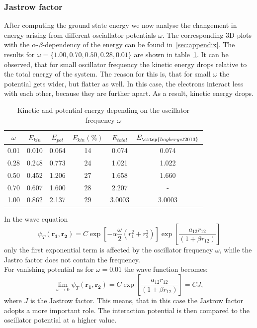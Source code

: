 \subsubsection{Jastrow factor}\label{sec:Jastro}
After computing the ground state energy we now analyse the changement in energy arising from different osciallator potentials $\omega$. The corresponding 3D-plots with the $\alpha$-$\beta$-dependency of the energy can be found in~\ref{sec:appendix}. The results for $\omega =\{1.00, 0.70, 0.50,0.28,0.01\}$ are shown in table~\ref{tab:omega}. It can be observed, that for small oscillator frequency the kinetic energy drops relative to the total energy of the system. The reason for this is, that for small $\omega$ the potential gets wider, but flatter as well. In this case, the electrons interact less with each other, because they are further apart. As a result, kinetic energy drops.\\
\begin{table}[H]
\centering
\caption{Kinetic and potential energy depending on the oscillator frequency $\omega$}
    \begin{tabular}{c|cc|c|c|c}
   \toprule
    $\omega$ & $E_{kin}$  & $E_{pot}$  & $E_{kin} (\%)$ & $E_{total}$ & $E_{\citep{hogberget2013}}$ \\ 
    \midrule
    0.01   & 0.010 & 0.064 & 14   & 0.074    & 0.074   \\
    0.28   & 0.248  & 0.773  & 24   & 1.021   & 1.022  \\
    0.50    & 0.452  & 1.206   & 27   & 1.658  & 1.660    \\
    0.70    & 0.607  & 1.600   & 28   &  2.207    & -   \\
    1.00      & 0.862  & 2.137   & 29   & 3.0003  & 3.0003    \\
    \bottomrule
    \end{tabular}
\label{tab:omega}
\end{table}
In the wave equation
\begin{equation}
\psi_T(\mathbf{r_1,r_2}) = C \exp\left[-\alpha\frac{\omega}{2} (r_1^2+r_2^2)\right] \exp \left[ \frac{a_{12} r_{12}}{(1+\beta r_{12})} \right]
\end{equation}
only the first exponential term is affected by the oscillator frequency $\omega$, while the Jastro factor does not contain the frequency.\\
For vanishing potential as for $\omega =0.01$ the wave function becomes:
\begin{equation}
\lim_{\omega\rightarrow 0} \psi_T(\mathbf{r_1,r_2}) = C \exp \left[ \frac{a_{12} r_{12}}{(1+\beta r_{12})} \right] = C J,
\end{equation}
where $J$ is the Jastrow factor. This means, that in this case the Jastrow factor adopts a more important role. The interaction potential is then compared to the oscillator potential at a higher value.
